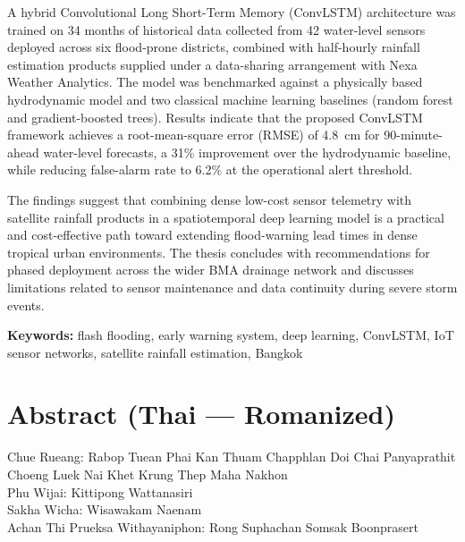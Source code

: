 \documentclass[12pt,a4paper]{report}
\begin{document}
\noindent
A hybrid Convolutional Long Short-Term Memory (ConvLSTM) architecture was trained on 34 months of historical data collected from 42 water-level sensors deployed across six flood-prone districts, combined with half-hourly rainfall estimation products supplied under a data-sharing arrangement with Nexa Weather Analytics. The model was benchmarked against a physically based hydrodynamic model and two classical machine learning baselines (random forest and gradient-boosted trees). Results indicate that the proposed ConvLSTM framework achieves a root-mean-square error (RMSE) of 4.8~cm for 90-minute-ahead water-level forecasts, a 31\% improvement over the hydrodynamic baseline, while reducing false-alarm rate to 6.2\% at the operational alert threshold.

\noindent
The findings suggest that combining dense low-cost sensor telemetry with satellite rainfall products in a spatiotemporal deep learning model is a practical and cost-effective path toward extending flood-warning lead times in dense tropical urban environments. The thesis concludes with recommendations for phased deployment across the wider BMA drainage network and discusses limitations related to sensor maintenance and data continuity during severe storm events.

\vspace{0.4cm}
\noindent\textbf{Keywords:} flash flooding, early warning system, deep learning, ConvLSTM, IoT sensor networks, satellite rainfall estimation, Bangkok

\chapter*{Abstract (Thai --- Romanized)}


\vspace{0.4cm}
\noindent
Chue Rueang: Rabop Tuean Phai Kan Thuam Chapphlan Doi Chai Panyaprathit Choeng Luek Nai Khet Krung Thep Maha Nakhon\\[4pt]
Phu Wijai: Kittipong Wattanasiri\\[4pt]
Sakha Wicha: Wisawakam Naenam\\[4pt]
Achan Thi Prueksa Withayaniphon: Rong Suphachan Somsak Boonprasert
\end{document}
